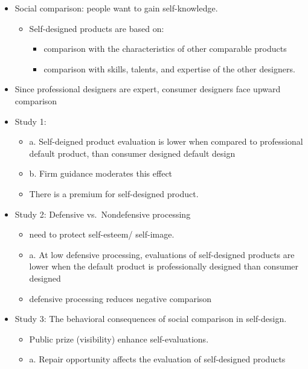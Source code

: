 \documentclass[
]{book}
\begin{document}
\begin{itemize}
\item
  Social comparison: people want to gain self-knowledge.

  \begin{itemize}
  \item
    Self-designed products are based on:

    \begin{itemize}
    \item
      comparison with the characteristics of other comparable products
    \item
      comparison with skills, talents, and expertise of the other designers.
    \end{itemize}
  \end{itemize}
\item
  Since professional designers are expert, consumer designers face upward comparison
\item
  Study 1:

  \begin{itemize}
  \item
    a. Self-deigned product evaluation is lower when compared to professional default product, than consumer designed default design
  \item
    b. Firm guidance moderates this effect
  \item
    There is a premium for self-designed product.
  \end{itemize}
\item
  Study 2: Defensive vs.~Nondefensive processing

  \begin{itemize}
  \item
    need to protect self-esteem/ self-image.
  \item
    a. At low defensive processing, evaluations of self-designed products are lower when the default product is professionally designed than consumer designed
  \item
    defensive processing reduces negative comparison
  \end{itemize}
\item
  Study 3: The behavioral consequences of social comparison in self-design.

  \begin{itemize}
  \item
    Public prize (visibility) enhance self-evaluations.
  \item
    a. Repair opportunity affects the evaluation of self-designed products
  \end{itemize}
\end{itemize}
\end{document}
